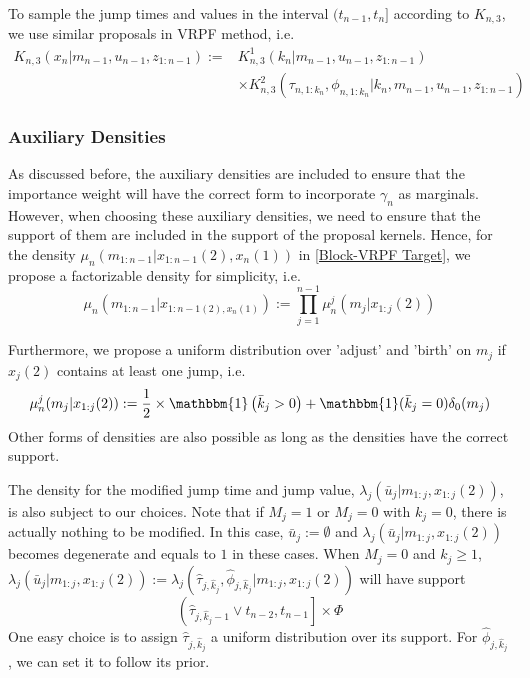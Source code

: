 \documentclass[12pt,a4paper]{article}
\begin{document}
To sample the jump times and values in the interval $(t_{n-1},t_n]$ according to $K_{n,3}$, we use similar proposals in VRPF method, i.e. 
\begin{equation}
\label{BlockVRPF-ProposedX}
\begin{split}
K_{n,3}\left(x_n|m_{n-1},u_{n-1},z_{1:n-1}\right):=& K_{n,3}^{1}\left(k_n|m_{n-1},u_{n-1},z_{1:n-1}\right)\\
& \times K_{n,3}^{2}\left(\tau_{n,1:k_n},\phi_{n,1:k_n}|k_n,m_{n-1},u_{n-1},z_{1:n-1}\right)
\end{split}
\end{equation}

\subsubsection{Auxiliary Densities}
As discussed before, the auxiliary densities are included to ensure that the importance weight will have the correct form to incorporate \(\gamma_n\) as marginals. However, when choosing these auxiliary densities, we need to ensure that the support of them are included in the support of the proposal kernels. Hence, for the density $\mu_n\left(m_{1:n-1}|x_{1:n-1}(2),x_n(1)\right)$ in \eqref{Block-VRPF Target}, we propose a factorizable density for simplicity, i.e.
\begin{equation*}
    \mu_n\left(m_{1:n-1}|x_{1:n-1(2),x_{n}(1)}\right) := \prod_{j=1}^{n-1} \mu_{n}^{j}\left(m_j|x_{1:j}(2)\right)
\end{equation*}

Furthermore, we propose a uniform distribution over 'adjust' and 'birth' on $m_{j}$ if $x_{j}(2)$ contains at least one jump, i.e.
$$\mu_n^j(m_j|x_{1:j}(2)) := \frac{1}{2}\times \mathbbm{1}\left(\bar{k}_j > 0\right) + \mathbbm{1}(\bar{k}_j=0)\delta_{0}(m_j)$$
Other forms of densities are also possible as long as the densities have the correct support. 

The density for the modified jump time and jump value, $\lambda_{j}\left(\bar{u}_{j}|m_{1:j},x_{1:j}(2)\right)$, is also subject to our choices. Note that if $M_{j} = 1$ or $M_{j}=0$ with $k_{j}=0$, there is actually nothing to be modified. In this case, $\bar{u}_{j} := \emptyset$ and  $\lambda_{j}\left(\bar{u}_{j}|m_{1:j},x_{1:j}(2)\right)$ becomes degenerate and equals to $1$ in these cases. When $M_{j}=0$ and $k_{j} \geq 1$, $\lambda_{j}\left(\bar{u}_{j}|m_{1:j},x_{1:j}(2)\right) := \lambda_{j}\left(\hat{\tau}_{j,\hat{k}_{j}},\hat{\phi}_{j,\hat{k}_{j}}|m_{1:j},x_{1:j}(2)\right)$ will have support 
$$\left(\hat{\tau}_{j,\hat{k}_{j}-1} \vee t_{n-2},t_{n-1}\right] \times \Phi$$
One easy choice is to assign $\hat{\tau}_{j,\hat{k}_{j}}$ a uniform distribution over its support. For $\hat{\phi}_{j,\hat{k}_{j}}$, we can set it to follow its prior. 
\end{document}

